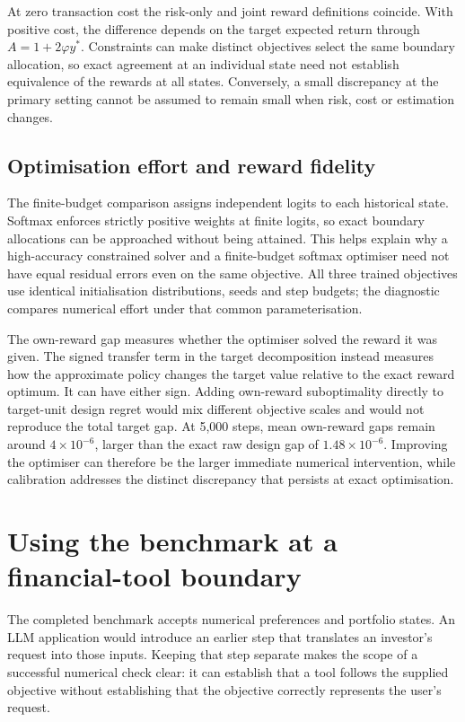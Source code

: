 \documentclass[sigconf,review]{acmart}
\begin{document}
At zero transaction cost the risk-only and joint reward definitions coincide. With positive cost, the difference depends on the target expected return through $A=1+2\varphi y^*$. Constraints can make distinct objectives select the same boundary allocation, so exact agreement at an individual state need not establish equivalence of the rewards at all states. Conversely, a small discrepancy at the primary setting cannot be assumed to remain small when risk, cost or estimation changes.

\subsection{Optimisation effort and reward fidelity}
The finite-budget comparison assigns independent logits to each historical state. Softmax enforces strictly positive weights at finite logits, so exact boundary allocations can be approached without being attained. This helps explain why a high-accuracy constrained solver and a finite-budget softmax optimiser need not have equal residual errors even on the same objective. All three trained objectives use identical initialisation distributions, seeds and step budgets; the diagnostic compares numerical effort under that common parameterisation.

The own-reward gap measures whether the optimiser solved the reward it was given. The signed transfer term in the target decomposition instead measures how the approximate policy changes the target value relative to the exact reward optimum. It can have either sign. Adding own-reward suboptimality directly to target-unit design regret would mix different objective scales and would not reproduce the total target gap. At 5,000 steps, mean own-reward gaps remain around $4\times10^{-6}$, larger than the exact raw design gap of $1.48\times10^{-6}$. Improving the optimiser can therefore be the larger immediate numerical intervention, while calibration addresses the distinct discrepancy that persists at exact optimisation.

\section{Using the benchmark at a financial-tool boundary}
The completed benchmark accepts numerical preferences and portfolio states. An LLM application would introduce an earlier step that translates an investor's request into those inputs. Keeping that step separate makes the scope of a successful numerical check clear: it can establish that a tool follows the supplied objective without establishing that the objective correctly represents the user's request.
\end{document}
